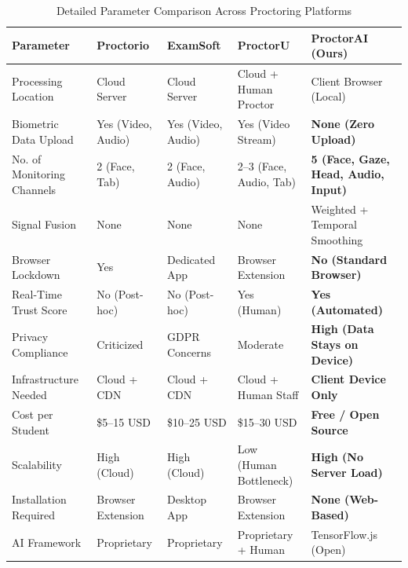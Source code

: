 \documentclass[conference]{IEEEtran}
\begin{document}
\begin{table}[htbp]
\caption{Detailed Parameter Comparison Across Proctoring Platforms}
\label{tab:params}
\centering
\renewcommand{\arraystretch}{1.25}
\begin{tabular}{@{}p{3.8cm}p{2.8cm}p{2.8cm}p{2.8cm}p{2.8cm}@{}}
\toprule
\textbf{Parameter} & \textbf{Proctorio} & \textbf{ExamSoft} & \textbf{ProctorU} & \textbf{ProctorAI (Ours)} \\
\midrule
Processing Location         & Cloud Server          & Cloud Server           & Cloud + Human Proctor    & Client Browser (Local) \\
Biometric Data Upload       & Yes (Video, Audio)    & Yes (Video, Audio)     & Yes (Video Stream)       & \textbf{None (Zero Upload)} \\
No. of Monitoring Channels  & 2 (Face, Tab)         & 2 (Face, Audio)        & 2--3 (Face, Audio, Tab)  & \textbf{5 (Face, Gaze, Head, Audio, Input)} \\
Signal Fusion               & None                  & None                   & None                     & Weighted + Temporal Smoothing \\
Browser Lockdown            & Yes                   & Dedicated App          & Browser Extension        & \textbf{No (Standard Browser)} \\
Real-Time Trust Score       & No (Post-hoc)         & No (Post-hoc)          & Yes (Human)              & \textbf{Yes (Automated)} \\
Privacy Compliance          & Criticized            & GDPR Concerns          & Moderate                 & \textbf{High (Data Stays on Device)} \\
Infrastructure Needed       & Cloud + CDN           & Cloud + CDN            & Cloud + Human Staff      & \textbf{Client Device Only} \\
Cost per Student            & \$5--15 USD           & \$10--25 USD           & \$15--30 USD             & \textbf{Free / Open Source} \\
Scalability                 & High (Cloud)          & High (Cloud)           & Low (Human Bottleneck)   & \textbf{High (No Server Load)} \\
Installation Required       & Browser Extension     & Desktop App            & Browser Extension        & \textbf{None (Web-Based)} \\
AI Framework                & Proprietary           & Proprietary            & Proprietary + Human      & TensorFlow.js (Open) \\
\bottomrule
\end{tabular}
\end{table}
\end{document}
